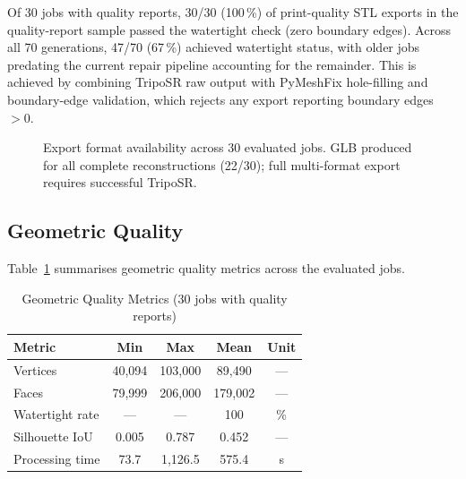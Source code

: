 \documentclass[conference]{IEEEtran}
\begin{document}
Of 30 jobs with quality reports, 30/30 (100\,\%) of print-quality STL exports in the quality-report sample passed the watertight check (zero boundary edges). Across all 70 generations, 47/70 (67\,\%) achieved watertight status, with older jobs predating the current repair pipeline accounting for the remainder. This is achieved by combining TripoSR raw output with PyMeshFix hole-filling and
boundary-edge validation, which rejects any export reporting boundary edges $> 0$.

\begin{figure}[htbp]
\centering
{}
\caption{Export format availability across 30 evaluated jobs. GLB produced for all complete reconstructions (22/30); full multi-format export requires successful TripoSR.}
\label{fig:exports}
\end{figure}

\subsection{Geometric Quality}

Table~\ref{tab:geom} summarises geometric quality metrics across the evaluated jobs.

\begin{table}[htbp]
\caption{Geometric Quality Metrics (30 jobs with quality reports)}
\label{tab:geom}
\centering
\begin{tabular}{lcccc}
\toprule
\textbf{Metric} & \textbf{Min} & \textbf{Max} & \textbf{Mean} & \textbf{Unit} \\
\midrule
Vertices          & 40{,}094 & 103{,}000 & 89{,}490 & --- \\
Faces             & 79{,}999 & 206{,}000 & 179{,}002 & --- \\
Watertight rate   & --- & --- & 100 & \% \\
Silhouette IoU    & 0.005 & 0.787 & 0.452 & --- \\
Processing time   & 73.7 & 1{,}126.5 & 575.4 & s \\
\bottomrule
\end{tabular}
\end{table}
\end{document}
